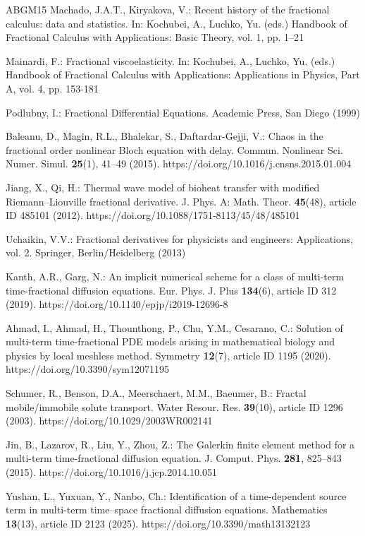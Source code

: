 \documentclass[12pt, reqno]{amsart}
\theoremstyle{definition}
\theoremstyle{remark}
\numberwithin{equation}{section}
\begin{document}
\begin{thebibliography}{ABGM15}
 Machado, J.A.T., Kiryakova, V.: Recent history of the fractional calculus: data and statistics. In: Kochubei, A., Luchko, Yu. (eds.) Handbook of Fractional Calculus with Applications: Basic Theory, vol. 1, pp. 1–21

  Mainardi, F.: Fractional viscoelasticity. In: Kochubei, A., Luchko, Yu. (eds.) Handbook of Fractional Calculus with Applications: Applications in Physics, Part A, vol. 4, pp. 153-181

 Podlubny, I.: Fractional Differential Equations. Academic Press, San Diego
(1999)

  Baleanu, D.,  Magin, R.L.,  Bhalekar, S.,  Daftardar-Gejji, V.: Chaos in the fractional order nonlinear Bloch equation with delay. Commun. Nonlinear Sci.
Numer. Simul. \textbf{25}(1), 41–49 (2015). https://doi.org/10.1016/j.cnsns.2015.01.004

  Jiang, X.,  Qi, H.: Thermal wave model of bioheat transfer with modified Riemann–Liouville fractional derivative. J. Phys. A: Math. Theor. \textbf{45}(48), article ID 485101 (2012). https://doi.org/10.1088/1751‑8113/45/48/485101

 Uchaikin, V.V.: Fractional derivatives for physicists and engineers: Applications, vol. 2. Springer, Berlin/Heidelberg (2013)

 Kanth, A.R., Garg, N.: An implicit numerical scheme for a class of multi-term time-fractional diffusion equations. Eur. Phys. J. Plus \textbf{134}(6), article ID 312 (2019). https://doi.org/10.1140/epjp/i2019-12696-8

 Ahmad, I., Ahmad, H., Thounthong, P., Chu, Y.M., Cesarano, C.: Solution of multi-term time-fractional PDE models arising in mathematical biology and physics by local meshless method. Symmetry \textbf{12}(7), article ID 1195 (2020). https://doi.org/10.3390/sym12071195

 Schumer, R., Benson, D.A., Meerschaert, M.M., Baeumer, B.: Fractal mobile/immobile solute transport. Water Resour. Res. \textbf{39}(10), article ID  1296 (2003). https://doi.org/10.1029/2003WR002141

 Jin, B., Lazarov, R., Liu, Y., Zhou, Z.: The Galerkin finite element method for a multi-term time-fractional diffusion equation. J. Comput. Phys. \textbf{281}, 825–843 (2015). https://doi.org/10.1016/j.jcp.2014.10.051

 Yushan, L., Yuxuan, Y., Nanbo, Ch.: Identification of a time-dependent source term in multi-term time–space fractional diffusion equations. Mathematics \textbf{13}(13), article ID 2123 (2025). https://doi.org/10.3390/math13132123


\end{thebibliography}
\end{document}
